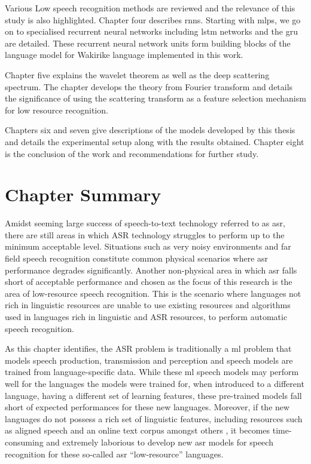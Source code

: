 Various Low speech recognition methods are reviewed and the relevance of this study is also highlighted.  Chapter four describes \acrfull{rnns}. Starting with \acrfull{mlps}, we go on to specialised recurrent neural networks including \acrfull{lstm} networks and the \acrfull{gru} are detailed. These recurrent neural network units form building blocks of the language model for Wakirike language implemented in this work.

Chapter five explains the wavelet theorem as well as the deep scattering spectrum. The chapter develops the theory from Fourier transform and details the significance of using the scattering transform as a feature selection mechanism for low resource recognition.  

Chapters six and seven give descriptions of the models developed by this thesis and details the experimental setup along with the results obtained. Chapter eight is the conclusion of the work and recommendations for further study. 

\section{Chapter Summary}
Amidst seeming large success of speech-to-text technology referred to as \acrfull{asr}, there are still areas in which ASR technology struggles to perform up to the minimum acceptable level.  Situations such as very noisy environments and far field speech recognition constitute common physical scenarios where \acrshort{asr} performance degrades significantly.  Another non-physical area in which \acrshort{asr} falls short of acceptable performance and chosen as the focus of this research is the area of low-resource speech recognition.  This is the scenario where languages not rich in linguistic resources are unable to use existing resources and algorithms used in languages rich in linguistic and ASR resources, to perform automatic speech recognition. 

As this chapter identifies, the ASR problem is traditionally a \acrlong{ml} problem that models   speech production, transmission and perception and speech models are trained from language-specific data. While these \acrshort{ml} speech models may perform well for the languages the models were trained for, when introduced to a different language, having a different set of learning features, these pre-trained models fall short of expected performances for these new languages. Moreover, if the new languages do not possess a rich set of linguistic features, including resources such as aligned speech and an online text corpus amongst others \citep{besacier2014introduction}, it becomes time-consuming and extremely laborious to develop new \acrshort{asr} models for speech recognition for these so-called \acrshort{asr} ``low-resource'' languages.

